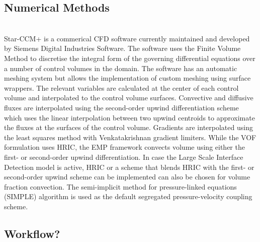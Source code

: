 \subsection{Numerical Methods}
\hfill\\
Star-CCM+ is a commerical CFD software currently maintained and developed 
 by Siemens Digital Industries Software. The software uses the Finite Volume Method to
 discretise the integral form of the governing differential equations over a number 
 of control volumes in the domain. The software has an automatic meshing system but allows
 the implementation of custom meshing using surface wrappers. The relevant variables are
 calculated at the center of each control volume and interpolated to the control volume surfaces.
 Convective and diffusive fluxes are interpolated using the second-order upwind differentiation
 scheme which uses the linear interpolation between two upwind centroids to approximate
 the fluxes at the surfaces of the control volume. Gradients are interpolated using 
 the least squares method with Venkatakrishnan gradient limiters.
 While the VOF formulation uses HRIC, 
 the EMP framework convects volume using either the first- or second-order upwind differentiation.
 In case the Large Scale Interface Detection model is active, 
 HRIC or a scheme that blends HRIC with the first- or second-order 
 upwind scheme can be implemented can also be chosen for volume fraction convection.
 The semi-implicit method for pressure-linked equations (SIMPLE) algorithm is used 
 as the default segregated pressure-velocity coupling scheme. 
\subsection{Workflow?}
